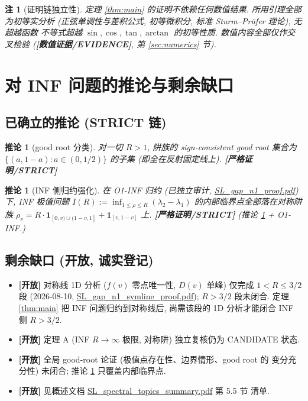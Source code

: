 \documentclass[UTF8]{ctexart}
\newtheorem{corollary}[theorem]{推论}
\newtheorem{remark}[theorem]{注}
\newcommand{\STRICT}{\textbf{[严格证明/STRICT]}}
\newcommand{\EVID}{\textbf{[数值证据/EVIDENCE]}}
\newcommand{\OPEN}{\textbf{[开放]}}
\begin{document}
\begin{remark}[证明链独立性]
	定理 \ref{thm:main} 的证明不依赖任何数值结果. 所用引理全部为初等实分析
	(正弦单调性与差积公式, 初等微积分, 标准 Sturm--Pr\"ufer 理论), 无超越函数
	不等式超越 $\sin,\cos,\tan,\arctan$ 的初等性质. 数值内容全部仅作交叉检验
	(\EVID, 第 \ref{sec:numerics} 节).
\end{remark}

\section{对 INF 问题的推论与剩余缺口}\label{sec:gaps}

\subsection{已确立的推论 (STRICT 链)}

\begin{corollary}[good root 分类]\label{cor:class}
	对一切 $R>1$, 阱族的 sign-consistent good root 集合为
	$\{(a,1-a):a\in(0,1/2)\}$ 的子集 (即全在反射固定线上). \STRICT{}
\end{corollary}

\begin{corollary}[INF 侧归约强化]\label{cor:reduction}
	在 O1-INF 归约 (已独立审计, \url{SL\_gap\_n1\_proof.pdf}) 下, INF 极值问题
	$I(R):=\inf_{1\le\rho\le R}(\lambda_2-\lambda_1)$ 的内部临界点全部落在对称阱族
	$\rho_v=R\cdot\mathbf1_{[0,v)\cup(1-v,1]}+\mathbf1_{[v,1-v]}$ 上.
	\STRICT{} (推论 \ref{cor:class} + O1-INF.)
\end{corollary}

\subsection{剩余缺口 (开放, 诚实登记)}\label{sec:gaps-open}

\begin{itemize}
	\item[(a$'$)] \OPEN{} 对称线 1D 分析 ($f(v)$ 零点唯一性, $D(v)$ 单峰) 仅完成
		$1<R\le3/2$ 段 (2026-08-10, \url{SL\_gap\_n1\_symline\_proof.pdf});
		$R>3/2$ 段未闭合. 定理 \ref{thm:main} 把 INF 问题归约到对称线后,
		尚需该段的 1D 分析才能闭合 INF 侧 $R>3/2$.
	\item[(c)] \OPEN{} 定理 A (INF $R\to\infty$ 极限, 对称阱) 独立复核仍为
		CANDIDATE 状态.
	\item[(d)] \OPEN{} 全局 good-root 论证 (极值点存在性、边界情形、good root 的
		变分充分性) 未闭合; 推论 \ref{cor:reduction} 只覆盖内部临界点.
	\item[其他] \OPEN{} 见概述文档 \url{SL\_spectral\_topics\_summary.pdf} 第 5.5 节
		清单.
\end{itemize}
\end{document}
